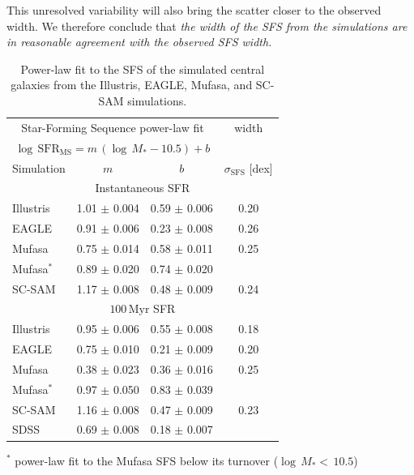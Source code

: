 \documentclass[tighten, preprint]{aastex62}
\begin{document}
This unresolved variability will also bring the scatter closer to 
the observed width. %
We therefore conclude that \emph{the width of the SFS from the simulations 
are in reasonable agreement with the observed SFS width.}



\begin{table}
\caption{Power-law fit to the SFS of the simulated central galaxies from the
Illustris, EAGLE, {\sc Mufasa}, and SC-SAM simulations.} 
\begin{center}
\begin{tabular}{p{3cm}ccc} \toprule
\multicolumn{3}{c}{Star-Forming Sequence power-law fit} & width \\ [3pt]
\multicolumn{3}{c}{$\log\,\mathrm{SFR}_\mathrm{MS} = m\,(\log\,M_* - 10.5) + b$  } & \\ [3pt]
Simulation & $m$ & $b$ & $\sigma_\mathrm{SFS}$ [dex] \\ 
\hline
\multicolumn{4}{c}{Instantaneous SFR} \\
Illustris 			& 1.01 $\pm$ 0.004 & 0.59 $\pm$ 0.006 & 0.20 \\ 
EAGLE 				& 0.91 $\pm$ 0.006 & 0.23 $\pm$ 0.008 & 0.26 \\ 
{\sc Mufasa} 		& 0.75 $\pm$ 0.014 & 0.58 $\pm$ 0.011 & 0.25 \\ 
{\sc Mufasa}$^*$ 	& 0.89 $\pm$ 0.020 & 0.74 $\pm$ 0.020 &  \\ 
SC-SAM 				& 1.17 $\pm$ 0.008 & 0.48 $\pm$ 0.009 & 0.24 \\ 
\hline \hline
\multicolumn{4}{c}{$100\,\mathrm{Myr}$ SFR} \\
Illustris 			& 0.95 $\pm$ 0.006 & 0.55 $\pm$ 0.008 & 0.18 \\
EAGLE  				& 0.75 $\pm$ 0.010 & 0.21 $\pm$ 0.009 & 0.20 \\
{\sc Mufasa}		& 0.38 $\pm$ 0.023 & 0.36 $\pm$ 0.016 & 0.25 \\
{\sc Mufasa}$^*$ 	& 0.97 $\pm$ 0.050 & 0.83 $\pm$ 0.039 & \\ 
SC-SAM 				& 1.16 $\pm$ 0.008 & 0.47 $\pm$ 0.009 & 0.23\\ 
\hline
\hline \hspace{10pt}
SDSS 				& 0.69 $\pm$ 0.008 & 0.18 $\pm$ 0.007 \\ 
\hline
\end{tabular} \label{tab:sfms_powerlaw}
\end{center}
$^*$ power-law fit to the {\sc Mufasa} SFS below its turnover ($\log\,M_* {<}\,10.5$)
\end{table}
\end{document}
